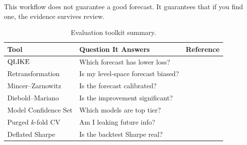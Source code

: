 \begin{keyidea}
This workflow does not guarantee a good forecast.
It guarantees that if you find one, the evidence survives review.
\end{keyidea}

\begin{table}[htbp]
\centering
\caption{Evaluation toolkit summary.}
\label{tab:eval-toolkit}
\small
\begin{tabular}{@{}llc@{}}
\toprule
\textbf{Tool} & \textbf{Question It Answers} & \textbf{Reference} \\
\midrule
$\operatorname{QLIKE}$            & Which forecast has lower loss?       & \citet{Patton2011} \\
Retransformation    & Is my level-space forecast biased?   & \citet{Patton2011} \\
Mincer--Zarnowitz   & Is the forecast calibrated?          & \citet{MincerZarnowitz1969} \\
Diebold--Mariano    & Is the improvement significant?      & \citet{DieboldMariano1995} \\
Model Confidence Set & Which models are top tier?           & \citet{HansenLundeNason2011} \\
Purged $k$-fold CV  & Am I leaking future info?            & \citet{LopezdePrado2018} \\
Deflated Sharpe     & Is the backtest Sharpe real?          & \citet{Bailey2014DSR} \\
\bottomrule
\end{tabular}
\end{table}
